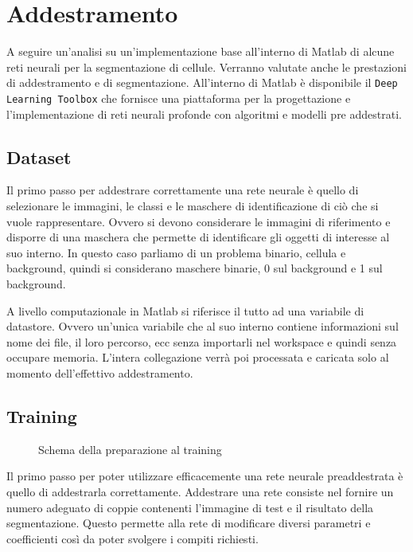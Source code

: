 \documentclass{ieeeojies}
\begin{document}
\section*{Addestramento}
A seguire un’analisi su un’implementazione base all’interno di Matlab di alcune reti neurali per la segmentazione di cellule. Verranno valutate anche le prestazioni di addestramento e di segmentazione. All’interno di Matlab è disponibile il \texttt{Deep Learning Toolbox} \cite{matlab} che fornisce una piattaforma per la progettazione e l’implementazione di reti neurali profonde con algoritmi e modelli pre addestrati.

\subsection{Dataset}

Il primo passo per addestrare correttamente una rete neurale è quello di selezionare le immagini, le classi e le maschere di identificazione di ciò che si vuole rappresentare. Ovvero si devono considerare le immagini di riferimento e disporre di una maschera che permette di identificare gli oggetti di interesse al suo interno. In questo caso parliamo di un problema binario, cellula e background, quindi si considerano maschere binarie, 0 sul background e 1 sul background.

A livello computazionale in Matlab si riferisce il tutto ad una variabile di datastore. Ovvero un’unica variabile che al suo interno contiene informazioni sul nome dei file, il loro percorso, ecc senza importarli nel workspace e quindi senza occupare memoria. L’intera collegazione verrà poi processata e caricata solo al momento dell’effettivo addestramento.

\subsection{Training}

\begin{figure*}
	\tiny{\def\svgwidth{\linewidth}
	}
\caption{Schema della preparazione al training}
\end{figure*}

Il primo passo per poter utilizzare efficacemente una rete neurale preaddestrata è quello di addestrarla correttamente. Addestrare una rete consiste nel fornire un numero adeguato di coppie contenenti l’immagine di test e il risultato della segmentazione. Questo permette alla rete di modificare diversi parametri e coefficienti così da poter svolgere i compiti richiesti.
\end{document}
